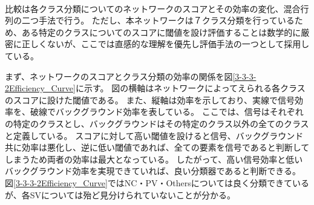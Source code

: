 \begin{table}[htb]
 \centering
　\small
  \caption{評価のための飛跡対についてのモデル}
  \label{EvalationModels}
\end{table}

比較は各クラス分類についてのネットワークのスコアとその効率の変化、混合行列の二つ手法で行う。
ただし、本ネットワークは７クラス分類を行っているため、ある特定のクラスについてのスコアに閾値を設け評価することは数学的に厳密に正しくないが、ここでは直感的な理解を優先し評価手法の一つとして採用している。

まず、ネットワークのスコアとクラス分類の効率の関係を図\ref{3-3-3-2Efficiency_Curve}に示す。
図の横軸はネットワークによってえられる各クラスのスコアに設けた閾値である。
また、縦軸は効率を示しており、実線で信号効率を、破線でバックグラウンド効率を表している。
ここでは、信号はそれぞれの特定のクラスとし、バックグラウンドはその特定のクラス以外の全てのクラスと定義している。
スコアに対して高い閾値を設けると信号、バックグラウンド共に効率は悪化し、逆に低い閾値であれば、全ての要素を信号であると判断してしまうため両者の効率は最大となっている。
したがって、高い信号効率と低いバックグラウンド効率を実現できていれば、良い分類器であると判断できる。
図\ref{3-3-3-2Efficiency_Curve}ではNC・PV・Othersについては良く分類できているが、各SVについては殆ど見分けられていないことが分かる。


